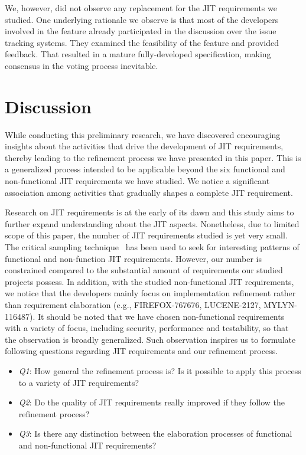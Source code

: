 \documentclass[review]{elsarticle}
\begin{document}
We, however, did not observe any replacement for the JIT requirements we studied. One underlying rationale we observe is that most of the developers involved in the feature already participated in the discussion over the issue tracking systems. They examined the feasibility of the feature and provided feedback. That resulted in a mature fully-developed specification, making consensus in the voting  process inevitable. 

\section{Discussion}
While conducting this preliminary research, we have discovered encouraging insights about the activities that drive the development of JIT requirements, thereby leading to the refinement process we have presented in this paper. This is a generalized process intended to be applicable beyond the six functional and non-functional JIT requirements we have studied. We notice a significant association among activities that gradually shapes a complete JIT requirement.

Research on JIT requirements is at the early of its dawn and this study aims to further expand understanding about the JIT aspects. Nonetheless, due to limited scope of this paper, the number of JIT requirements studied is yet very small. The critical sampling technique~\cite{patton} has been used to seek for interesting patterns of functional and non-function JIT requirements. However, our number is constrained compared to the substantial amount of requirements our studied projects possess. In addition, with the studied non-functional JIT requirements, we notice that the developers mainly focus on implementation refinement rather than requirement elaboration (e.g., FIREFOX-767676, LUCENE-2127, MYLYN-116487). It should be noted that we have chosen non-functional requirements with a variety of focus, including security, performance and testability, so that the observation is broadly generalized. Such observation inspires us to formulate following questions regarding JIT requirements and our refinement process.
\begin{itemize}
\item \textit{Q1}: How general the refinement process is? Is it possible to apply this process to a variety of JIT requirements?
\item \textit{Q2}: Do the quality of JIT requirements really improved if they follow the refinement process?
\item \textit{Q3}: Is there any distinction between the elaboration processes of functional and non-functional JIT requirements?
\end{itemize} 
\end{document}
